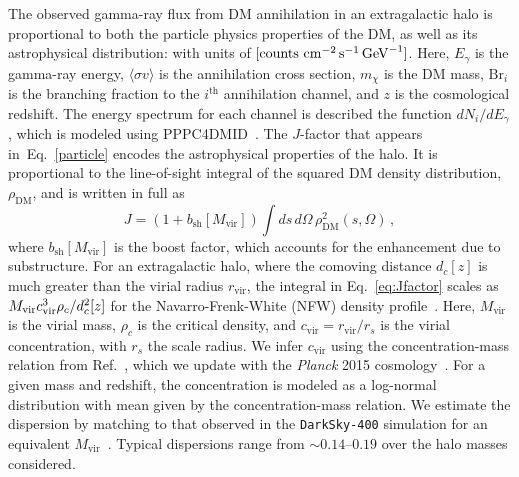 The observed gamma-ray flux from DM annihilation in an extragalactic halo is proportional to both the particle physics properties of the DM, as well as its astrophysical distribution:
with units of $[{\rm counts} \,\,{\rm cm}^{-2} \, {\rm s}^{-1} \, {\rm GeV}^{-1}]$.  Here, $E_\gamma$ is the gamma-ray energy, $\langle \sigma v \rangle$ is the annihilation cross section, $m_\chi$ is the DM mass, $\text{Br}_{i}$ is the branching fraction to the $i^\text{th}$ annihilation channel, and $z$ is the cosmological redshift.  The energy spectrum for each channel is described the function $dN_{i}/dE_{\gamma}$, which is modeled using PPPC4DMID~\cite{Cirelli:2010xx}.  The $J$-factor that appears in~Eq.~\ref{particle} encodes the astrophysical properties of the halo.  It is proportional to the line-of-sight integral of the squared DM density distribution, $\rho_\text{DM}$, and is written in full as 
\begin{equation}
J = \left(1+b_\text{sh}[M_\text{vir}] \right)  \int ds\,d \Omega \,\rho^{2}_\text{DM}(s,\Omega) \, ,
\label{eq:Jfactor}
\end{equation}
where $b_\text{sh}[M_\text{vir}]$ is the boost factor, which accounts for the enhancement due to substructure.  For an extragalactic halo, where the comoving distance $d_c[z]$ is much greater than the virial radius $r_\text{vir}$, the integral in Eq.~\ref{eq:Jfactor} scales as $M_{\rm vir} c_{\rm vir}^3\rho_c/d_c^2[z]$ for the Navarro-Frenk-White (NFW) density profile~\cite{Navarro:1996gj}.  Here, $M_\text{vir}$ is the virial mass, $\rho_c$ is the critical density, and $c_\text{vir}=r_\text{vir}/r_s$ is the virial concentration, with $r_s$ the scale radius.  We infer $c_\text{vir}$ using the concentration-mass relation from Ref.~\cite{Correa:2015dva}, which we update with the \emph{Planck} 2015 cosmology~\cite{Ade:2015xua}.  
For a given mass and redshift, the concentration is modeled as a log-normal distribution with mean given by the concentration-mass relation.  We estimate the dispersion by matching to that observed in the \texttt{DarkSky-400} simulation for an equivalent $M_\text{vir}$~\cite{Lehmann:2015ioa}.  Typical dispersions range from $\sim$$0.14$--$0.19$ over the halo masses considered. 

